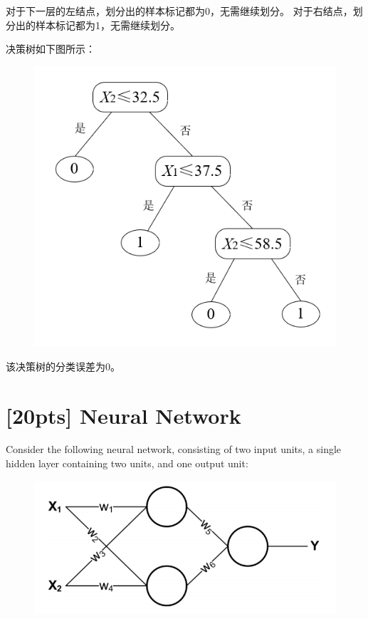 \documentclass{article}
\begin{document}
	对于下一层的左结点，划分出的样本标记都为0，无需继续划分。
	对于右结点，划分出的样本标记都为1，无需继续划分。

	决策树如下图所示：
	\begin{figure}[H]
		\centering
		\includegraphics[scale=0.7]{p1-dt2.PNG}
	\end{figure}

	该决策树的分类误差为0。
	



	\newpage
	\section{[20pts] Neural Network}
	\noindent Consider the following neural network, consisting of two input units, a single hidden layer containing two units, and one output unit:
	
	\begin{figure}[H]
		\centering
		\includegraphics[scale=0.5]{p2-nn1.png}
	\end{figure}
\end{document}
